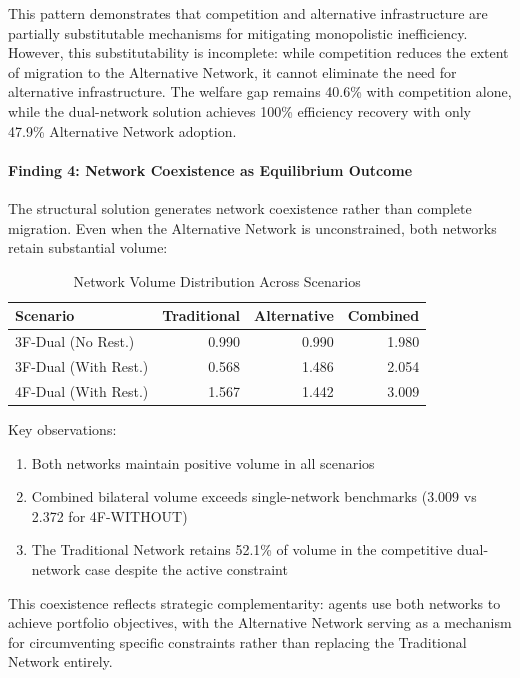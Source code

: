This pattern demonstrates that competition and alternative infrastructure are partially substitutable mechanisms for mitigating monopolistic inefficiency. However, this substitutability is incomplete: while competition reduces the extent of migration to the Alternative Network, it cannot eliminate the need for alternative infrastructure. The welfare gap remains 40.6\% with competition alone, while the dual-network solution achieves 100\% efficiency recovery with only 47.9\% Alternative Network adoption.

\paragraph{Finding 4: Network Coexistence as Equilibrium Outcome}

The structural solution generates network coexistence rather than complete migration. Even when the Alternative Network is unconstrained, both networks retain substantial volume:

\begin{table}[h]
\centering
\caption{Network Volume Distribution Across Scenarios}
\label{tab:network_volume_dist}
\begin{tabular}{lrrr}
\hline
\textbf{Scenario} & \textbf{Traditional} & \textbf{Alternative} & \textbf{Combined} \\ \hline
3F-Dual (No Rest.) & 0.990 & 0.990 & 1.980 \\
3F-Dual (With Rest.) & 0.568 & 1.486 & 2.054 \\
4F-Dual (With Rest.) & 1.567 & 1.442 & 3.009 \\
\hline
\end{tabular}
\end{table}

Key observations:
\begin{enumerate}
    \item Both networks maintain positive volume in all scenarios
    \item Combined bilateral volume exceeds single-network benchmarks (3.009 vs 2.372 for 4F-WITHOUT)
    \item The Traditional Network retains 52.1\% of volume in the competitive dual-network case despite the active constraint
\end{enumerate}

This coexistence reflects strategic complementarity: agents use both networks to achieve portfolio objectives, with the Alternative Network serving as a mechanism for circumventing specific constraints rather than replacing the Traditional Network entirely.

